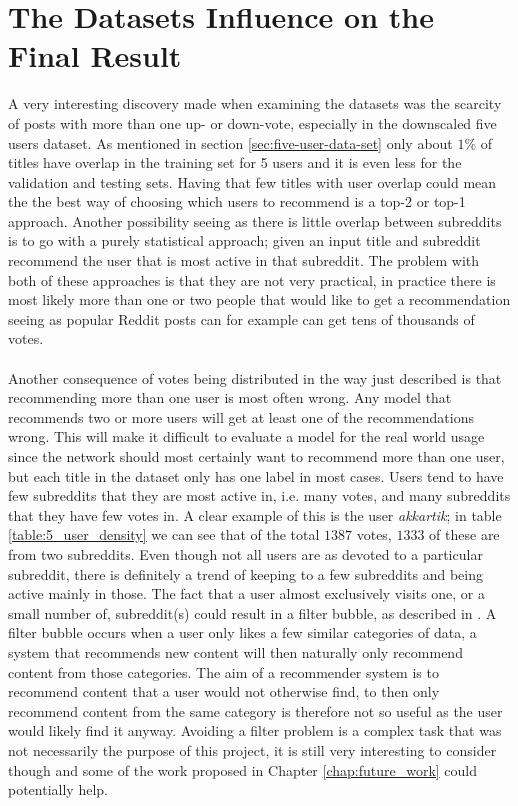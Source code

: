 \section{The Datasets Influence on the Final Result}\label{sec:dataset}
A very interesting discovery made when examining the datasets was the scarcity of posts with more than one up- or down-vote, especially in the downscaled five users dataset. As mentioned in section  \ref{sec:five-user-data-set} only about $1\%$ of titles have overlap in the training set for 5 users and it is even less for the validation and testing sets. Having that few titles with user overlap could mean the the best way of choosing which users to recommend is a top-2 or top-1 approach. Another possibility seeing as there is little overlap between subreddits is to go with a purely statistical approach; given an input title and subreddit recommend the user that is most active in that subreddit. The problem with both of these approaches is that they are not very practical, in practice there is most likely more than one or two people that would like to get a recommendation seeing as popular Reddit posts can for example can get tens of thousands of votes.
\\\\
Another consequence of votes being distributed in the way just described is that recommending more than one user is most often wrong. Any model that recommends two or more users will get at least one of the recommendations wrong. This will make it difficult to evaluate a model for the real world usage since the network should most certainly want to recommend more than one user, but each title in the dataset only has one label in most cases. Users tend to have few subreddits that they are most active in, i.e. many votes, and many subreddits that they have few votes in. A clear example of this is the user \textit{akkartik}; in table \ref{table:5_user_density} we can see that of the total $1387$ votes, $1333$ of these are from two subreddits. Even though not all users are as devoted to a particular subreddit, there is definitely a trend of keeping to a few subreddits and being active mainly in those. The fact that a user almost exclusively visits one, or a small number of, subreddit(s) could result in a filter bubble, as described in \cite{pariser2011filter}. A filter bubble occurs when a user only likes a few similar categories of data, a system that recommends new content will then naturally only recommend content from those categories. The aim of a recommender system is to recommend content that a user would not otherwise find, to then only recommend content from the same category is therefore not so useful as the user would likely find it anyway. Avoiding a filter problem is a complex task that was not necessarily the purpose of this project, it is still very interesting to consider though and some of the work proposed in Chapter \ref{chap:future_work} could potentially help.
